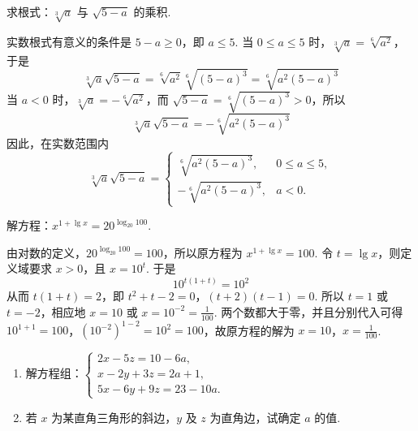 \begin{problem}
求根式：\(\sqrt[3]{a}\) 与 \(\sqrt{5-a}\) 的乘积.
\end{problem}

\begin{solution}
实数根式有意义的条件是 \(5-a\ge0\)，即 \(a\le5\). 当 \(0\le a\le5\) 时，\(\sqrt[3]{a}=\sqrt[6]{a^2}\)，于是
\[
\sqrt[3]{a}\sqrt{5-a}=\sqrt[6]{a^2}\sqrt[6]{\left(5-a\right)^3}=\sqrt[6]{a^2\left(5-a\right)^3}
\]
当 \(a<0\) 时，\(\sqrt[3]{a}=-\sqrt[6]{a^2}\)，而 \(\sqrt{5-a}=\sqrt[6]{(5-a)^3}>0\)，所以
\[
\sqrt[3]{a}\sqrt{5-a}=-\sqrt[6]{a^2\left(5-a\right)^3}
\]
因此，在实数范围内
\[
\sqrt[3]{a}\sqrt{5-a}=\begin{cases}
\sqrt[6]{a^2\left(5-a\right)^3},&0\le a\le5,\\
-\sqrt[6]{a^2\left(5-a\right)^3},&a<0.
\end{cases}
\]
\end{solution}

\begin{problem}
解方程：\(x^{1+\lg x}=20^{\log_{20}100}\).
\end{problem}

\begin{solution}
由对数的定义，\(20^{\log_{20}100}=100\)，所以原方程为 \(x^{1+\lg x}=100\). 令 \(t=\lg x\)，则定义域要求 \(x>0\)，且 \(x=10^t\). 于是
\[
10^{t\left(1+t\right)}=10^2
\]
从而 \(t(1+t)=2\)，即
\(t^2+t-2=0\)，\(\left(t+2\right)\left(t-1\right)=0\).
所以 \(t=1\) 或 \(t=-2\)，相应地 \(x=10\) 或 \(x=10^{-2}=\frac1{100}\). 两个数都大于零，并且分别代入可得 \(10^{1+1}=100\)，\(\left(10^{-2}\right)^{1-2}=10^2=100\)，故原方程的解为 \(x=10\)，\(x=\frac1{100}\).
\end{solution}

\begin{problem}
\begin{enumerate}
\item 解方程组：\(\begin{cases}
2x-5z=10-6a,\\
x-2y+3z=2a+1,\\
5x-6y+9z=23-10a.
\end{cases}\)
\item 若 \(x\) 为某直角三角形的斜边，\(y\) 及 \(z\) 为直角边，试确定 \(a\) 的值.
\end{enumerate}
\end{problem}

